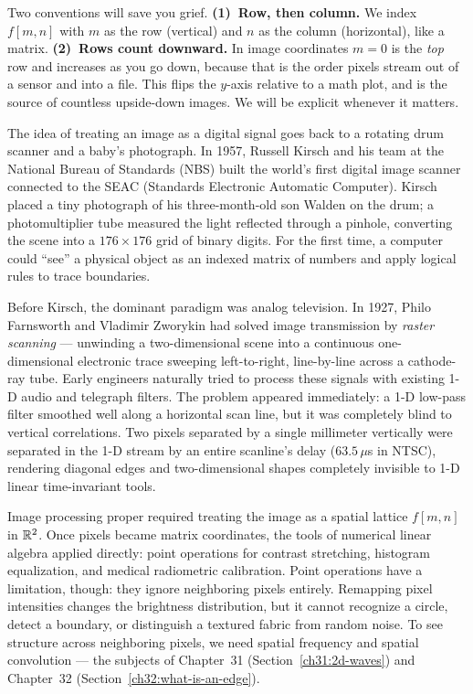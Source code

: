 \begin{focusbox}
Two conventions will save you grief. \textbf{(1)~Row, then column.} We index
$f[m,n]$ with $m$ as the row (vertical) and $n$ as the column (horizontal), like
a matrix. \textbf{(2)~Rows count downward.} In image coordinates $m=0$ is the
\emph{top} row and increases as you go down, because that is the order pixels
stream out of a sensor and into a file. This flips the $y$-axis relative to a
math plot, and is the source of countless upside-down images. We will be explicit
whenever it matters.
\end{focusbox}

\begin{historybox}
The idea of treating an image as a digital signal goes back to
a rotating drum scanner and a baby's photograph. In 1957, Russell Kirsch and his team
at the National Bureau of Standards (NBS) built the world's first digital image scanner
connected to the SEAC (Standards Electronic Automatic Computer). Kirsch placed a tiny
photograph of his three-month-old son Walden on the drum; a photomultiplier tube measured
the light reflected through a pinhole, converting the scene into a $176\times 176$ grid
of binary digits. For the first time, a computer could ``see'' a physical
object as an indexed matrix of numbers and apply logical rules to trace boundaries.

Before Kirsch, the dominant paradigm was analog television. In 1927, Philo Farnsworth
and Vladimir Zworykin had solved image transmission by \emph{raster scanning} ---
unwinding a two-dimensional scene into a continuous one-dimensional electronic trace
sweeping left-to-right, line-by-line across a cathode-ray tube. Early engineers
naturally tried to process these signals with existing 1-D audio and telegraph filters.
The problem appeared immediately: a 1-D low-pass filter smoothed well along a
horizontal scan line, but it was completely blind to vertical correlations. Two pixels
separated by a single millimeter vertically were separated in the 1-D stream by an
entire scanline's delay ($63.5\,\mu$s in NTSC), rendering diagonal edges and two-dimensional
shapes completely invisible to 1-D linear time-invariant tools.

Image processing proper required treating the image
as a spatial lattice $f[m,n]$ in $\mathbb{R}^2$.
Once pixels became matrix coordinates, the tools of numerical linear algebra
applied directly: point operations for contrast stretching, histogram equalization, and
medical radiometric calibration. Point operations have a limitation, though:
they ignore neighboring pixels entirely. Remapping pixel intensities changes the
brightness distribution, but it cannot recognize a circle, detect a boundary, or
distinguish a textured fabric from random noise. To see structure across neighboring
pixels, we need spatial frequency and spatial convolution --- the subjects of
Chapter~31 (Section~\ref{ch31:2d-waves}) and Chapter~32 (Section~\ref{ch32:what-is-an-edge}).
\end{historybox}

